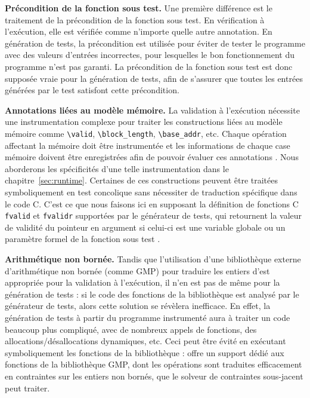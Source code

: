\textbf{Précondition de la fonction sous test.}
Une première différence est le traitement de la précondition de la fonction sous
test.
En vérification à l'exécution, elle est vérifiée comme n'importe quelle autre
annotation.
En génération de tests, la précondition est utilisée pour éviter de tester le
programme avec des valeurs d'entrées incorrectes, pour lesquelles le bon
fonctionnement du programme n'est pas garanti.
La précondition de la fonction sous test est donc supposée vraie pour la
génération de tests, afin de s'assurer que toutes les entrées générées par le
test satisfont cette précondition.

\textbf{Annotations liées au modèle mémoire.}
La validation à l'exécution nécessite une instrumentation complexe pour traiter
les constructions \eacsl liées au modèle mémoire comme \lstinline'\valid',
\lstinline'\block_length', \lstinline'\base_addr', etc.
Chaque opération affectant la mémoire doit être instrumentée et les informations
de chaque case mémoire doivent être enregistrées afin de pouvoir évaluer ces
annotations \cite{Kosmatov/RV13}.
Nous aborderons les spécificités d'une telle instrumentation dans le
chapitre~\ref{sec:runtime}.
Certaines de ces constructions peuvent être traitées symboliquement en test
concolique sans nécessiter de traduction spécifique dans le code C.
C'est ce que nous faisons ici en supposant la définition de fonctions C
\lstinline'fvalid' et \lstinline'fvalidr' supportées par le générateur de tests,
qui retournent la valeur de validité du pointeur en argument si celui-ci est
une variable globale ou un paramètre formel de la fonction sous test
\cite{Chebaro/ICSSEA12}.

\textbf{Arithmétique non bornée.}
Tandis que l'utilisation d'une bibliothèque externe d'arithmétique non bornée
(comme GMP) pour traduire les entiers d'\eacsl est appropriée pour la validation
à l'exécution, il n'en est pas de même pour la génération de tests :
si le code des fonctions de la bibliothèque est analysé par le
générateur de tests, alors cette solution se révèlera inefficace.
En effet, la génération de tests à partir du programme instrumenté aura à
traiter un code beaucoup plus compliqué, avec de nombreux appels de fonctions, 
des allocations/désallocations dynamiques, etc.
Ceci peut être évité en exécutant symboliquement les fonctions de la
bibliothèque : \pathcrawler offre un support dédié aux fonctions de la
bibliothèque GMP, dont les opérations sont traduites efficacement en contraintes
sur les entiers non bornés, que le solveur de contraintes sous-jacent peut
traiter.

